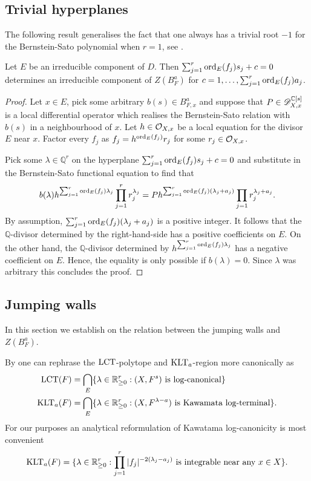 \subsection{Trivial hyperplanes}
The following result generalises the fact that one always has a trivial root $-1$ for the Bernstein-Sato polynomial when $r=1$, see .
\begin{proposition}
  Let $E$ be an irreducible component of $D$.
  Then $\sum_{j=1}^r \operatorname{ord}_{E}(f_j)s_j + c = 0$ determines an irreducible component of $Z(B_F^a)$ for $c = 1,\ldots, \sum_{j=1}^{r}\operatorname{ord}_{E}(f_j)a_j$.
\end{proposition}
\begin{proof}
  Let $x\in E$, pick some arbitrary $b(s)\in B_{F,x}^a$ and suppose that $P\in \mathscr{D}_{X,x}^{\mathbb{C}[s]}$ is a local differential operator which realises the Bernstein-Sato relation with $b(s)$ in a neighbourhood of $x$.
  Let $h \in \mathcal{O}_{X,x}$ be a local equation for the divisor $E$ near $x$.
  Factor every $f_j$ as $f_j = h^{\operatorname{ord}_E(f_j)} r_j$ for some $r_j\in \mathcal{O}_{X,x}$.

  Pick some $\lambda\in \mathbb{Q}^r$ on the hyperplane $\sum_{j=1}^r \operatorname{ord}_{E}(f_j)s_j + c = 0$ and substitute in the Bernstein-Sato functional equation to find that
  $$b(\lambda)h^{\sum_{j=1}^r \operatorname{ord}_{E}(f_j) \lambda_j} \prod_{j=1}^r r_{j}^{\lambda_j} = P h^{\sum_{j=1}^r \operatorname{ord}_E(f_j)(\lambda_j + a_j)} \prod_{j=1}r_j^{\lambda_j + a_j}.$$
  By assumption, $\sum_{j=1}^r \operatorname{ord}_E(f_j)(\lambda_j + a_j)$ is a positive integer.
  It follows that the $\mathbb{Q}$-divisor determined by the right-hand-side has a positive coefficients on $E$.
  On the other hand, the $\mathbb{Q}$-divisor determined by $h^{\sum_{j=1}^r \operatorname{ord}_{E}(f_j) \lambda_j}$ has a negative coefficient on $E$.
  Hence, the equality is only possible if $b(\lambda)=0$.
  Since $\lambda$ was arbitrary this concludes the proof.
\end{proof}
\subsection{Jumping walls}\label{sec: JumpingWall}
In this section we establish  on the relation between the jumping walls and $Z(B_F^a).$

By \cite[Corollary 3.12]{kollar1997singularities} one can rephrase the $\operatorname{LCT}$-polytope and $\operatorname{KLT}_a$-region more canonically as
\begin{align*}
    \operatorname{LCT}(F) &=  \bigcap_{E}\{\lambda\in \mathbb{R}_{\geq 0}^r : (X,F^s) \text{ is log-canonical}\}\\
    \operatorname{KLT}_{a}(F)&= \bigcap_{E}\{\lambda\in \mathbb{R}_{\geq 0}^r: (X,F^{\lambda - a}) \text{ is Kawamata log-terminal}\}.
\end{align*}
For our purposes an analytical reformulation of Kawatama log-canonicity \cite[Proposition 3.20]{kollar1997singularities} is most convenient
$$\operatorname{KLT}_a(F) = \{\lambda\in \mathbb{R}_{\geq 0}^r : \prod_{j=1}^r \vert f_j \vert^{-2(\lambda_j-a_j)}\text{ is integrable near any }x\in X\}.$$


